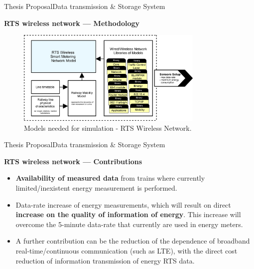 \begin{frame}{Thesis Proposal}{Data transmission \& Storage System}
\begin{block}{\textbf{RTS wireless network --- Methodology}}

\begin{figure}[ht!]
	\centering
	\includegraphics[width=0.8\textwidth,keepaspectratio]{figures/40.Method/methodWireless}
	\caption{Models needed for simulation - RTS Wireless Network.}
\end{figure}

\end{block}
\end{frame}

\begin{frame}{Thesis Proposal}{Data transmission \& Storage System}
\begin{block}{\textbf{RTS wireless network --- Contributions}}
\begin{itemize}
\item \textbf{Availability of measured data} from trains where currently limited/inexistent energy measurement is performed.

\item Data-rate increase of energy measurements, which will result on direct \textbf{increase on the quality of information of energy}. This increase will overcome the 5-minute data-rate that currently are used in energy meters.

\item A further contribution can be the reduction of the dependence of broadband real-time/continuous communication (such as \ac{LTE}), with the direct cost reduction of information transmission of energy \ac{RTS} data.
\end{itemize}
\end{block}
\end{frame}

